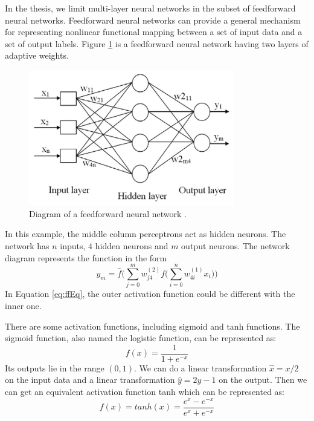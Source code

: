 In the thesis, we limit multi-layer neural networks in the subset of feedforward neural networks. Feedforward neural networks can provide a general mechanism for representing nonlinear functional mapping between a set of input data and a set of output labels. Figure \ref{fig:ffnet} is a feedforward neural network having two layers of adaptive weights.

\begin{figure}[!htb]
\centering
\includegraphics[width=0.8\textwidth]{Figure2-2.png}
\caption{\label{fig:ffnet}Diagram of a feedforward neural network \citep{zainal2013oil}.}
\end{figure}

In this example, the middle column perceptrons act as hidden neurons. The network has $n$ inputs, $4$ hidden neurons and $m$ output neurons. The network diagram represents the function in the form
\begin{equation}\label{eq:ffEq}
y_{m} = \hat{f}\Big(\sum_{j=0}^{m}w_{j4}^{(2)}f\big(\sum_{i=0}^{n}w_{4i}^{(1)}x_{i}\big)\Big)
\end{equation}
In Equation \ref{eq:ffEq}, the outer activation function could be different with the inner one.

There are some activation functions, including sigmoid and tanh functions. The sigmoid function, also named the logistic function, can be represented as: 
\begin{equation}\label{eq:sigmoid}
f(x) = \frac{1}{1+e^{-x}}
\end{equation}
Its outputs lie in the range $(0,1)$. We can do a linear transformation $\hat{x}=x/2$ on the input data and a linear transformation $\hat{y}=2y-1$ on the output. Then we can get an equivalent activation function tanh which can be represented as:
\begin{equation}\label{eq:tanh}
f(x) = tanh(x) = \frac{e^{x}-e^{-x}}{e^{x}+e^{-x}}
\end{equation}

